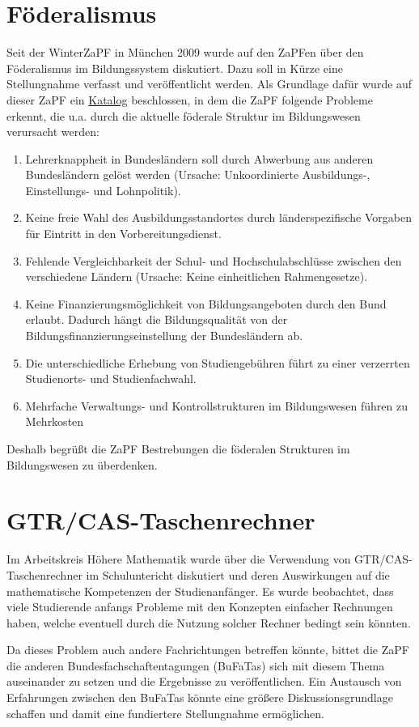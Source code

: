 \documentclass{scrartcl}
\begin{document}
\section*{Föderalismus}
Seit der WinterZaPF in München 2009 wurde auf den ZaPFen über den Föderalismus im Bildungssystem diskutiert. Dazu soll
in Kürze eine Stellungnahme verfasst und veröffentlicht werden. Als Grundlage dafür wurde auf dieser ZaPF ein
\href{http://zapfev.de/sites/default/files/2011_05_Katalog-Foederalismus.pdf}{Katalog} beschlossen, in dem die
ZaPF folgende Probleme erkennt, die u.a.
durch die aktuelle föderale Struktur im Bildungswesen verursacht werden:
\begin{enumerate}
 \item Lehrerknappheit in Bundesländern soll durch Abwerbung aus anderen Bundesländern gelöst werden (Ursache:
Unkoordinierte Ausbildungs-, Einstellungs- und Lohnpolitik).
 \item Keine freie Wahl des Ausbildungsstandortes durch länderspezifische Vorgaben für Eintritt in den
Vorbereitungsdienst.
 \item Fehlende Vergleichbarkeit der Schul- und Hochschulabschlüsse zwischen den verschiedene Ländern (Ursache: Keine
einheitlichen Rahmengesetze).
 \item Keine Finanzierungsmöglichkeit von Bildungsangeboten durch den Bund erlaubt. Dadurch hängt die Bildungsqualität
von der Bildungsfinanzierungseinstellung der Bundesländern ab.
 \item Die unterschiedliche Erhebung von Studiengebühren führt zu einer verzerrten Studien\-orts- und Studienfachwahl.
 \item Mehrfache Verwaltungs- und Kontrollstrukturen im Bildungswesen führen zu Mehrkosten
\end{enumerate}
Deshalb begrüßt die ZaPF Bestrebungen die föderalen Strukturen im Bildungswesen zu überdenken.

\section*{GTR/CAS-Taschenrechner}
Im Arbeitskreis Höhere Mathematik wurde über die Verwendung von GTR/CAS-Taschen\-rechner im Schuluntericht diskutiert
und deren Auswirkungen auf die mathematische Kompetenzen der Studienanfänger. Es wurde beobachtet, dass viele
Studierende anfangs Probleme mit den Konzepten einfacher Rechnungen haben, welche eventuell durch die
Nutzung solcher Rechner bedingt sein könnten. 

Da dieses Problem auch andere Fachrichtungen betreffen könnte, bittet die ZaPF die anderen Bundesfachschaftentagungen
(BuFaTas) sich mit diesem Thema auseinander zu setzen und die Ergebnisse zu veröffentlichen. Ein Austausch von
Erfahrungen zwischen den BuFaTas könnte eine größere Diskussionsgrundlage schaffen und damit eine fundiertere
Stellungnahme ermöglichen.
\end{document}

